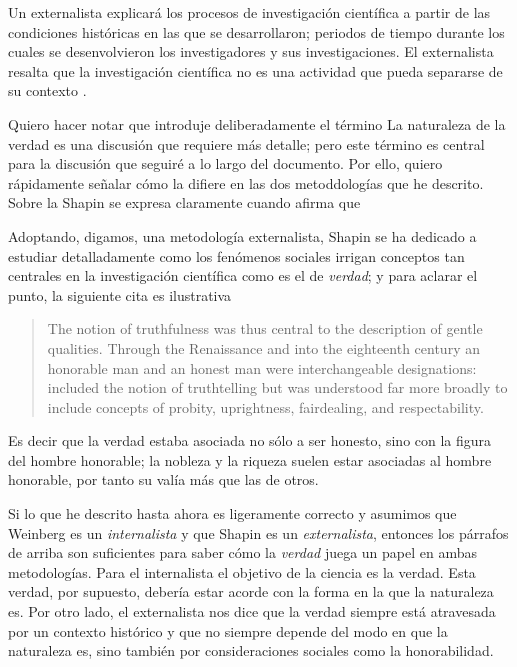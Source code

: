 Un externalista explicará los procesos de investigación científica a partir de las condiciones históricas en las que se desarrollaron; periodos de tiempo durante los cuales se desenvolvieron los investigadores y sus investigaciones.
El externalista resalta que la investigación científica no es una actividad que pueda separarse de su contexto .

Quiero hacer notar que introduje deliberadamente el término 
La naturaleza de la verdad es una discusión que requiere más detalle; pero este término es central para la discusión que seguiré a lo largo del documento.
Por ello, quiero rápidamente señalar cómo la  difiere en las dos metoddologías que he descrito.
Sobre la  Shapin se expresa claramente cuando afirma que  \parencite[Capítulo 2]{shapin2010never}

Adoptando, digamos, una metodología externalista, Shapin se ha dedicado a estudiar detalladamente como los fenómenos sociales irrigan conceptos tan centrales en la investigación científica como es el de \emph{verdad}; y para aclarar el punto, la siguiente cita es ilustrativa

\begin{quote}
	The notion of truthfulness was thus central to the description of gentle qualities.
	Through the Renaissance and into the eighteenth century an honorable man and an honest man were interchangeable designations:  included the notion of truthtelling but was understood far more broadly to include concepts of probity, uprightness, fairdealing, and respectability. \parencite[pp. 70-71]{Shapin1995}
\end{quote}

Es decir que la verdad estaba asociada no sólo a ser honesto, sino con la figura del hombre honorable; la nobleza y la riqueza suelen estar asociadas al hombre honorable, por tanto su  valía más que las de otros.

Si lo que he descrito hasta ahora es ligeramente correcto y asumimos que Weinberg es un \emph{internalista} y que Shapin es un \emph{externalista}, entonces los párrafos de arriba son suficientes para saber cómo la \emph{verdad} juega un papel en ambas metodologías.
Para el internalista el objetivo de la ciencia es la verdad.
Esta verdad, por supuesto, debería estar acorde con la forma en la que la naturaleza es.
Por otro lado, el externalista nos dice que la verdad siempre está atravesada por un contexto histórico y que no siempre depende del modo en que la naturaleza es, sino también por consideraciones sociales como la honorabilidad.

